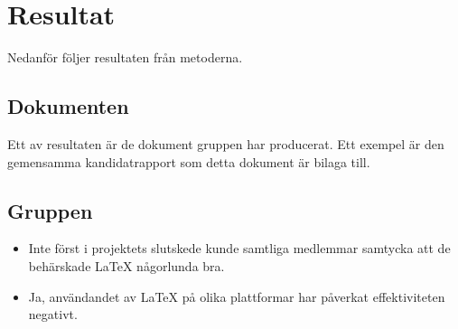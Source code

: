 \section{Resultat}
Nedanför följer resultaten från metoderna. 
\subsection{Dokumenten}
Ett av resultaten är de dokument gruppen har producerat. Ett exempel är den gemensamma kandidatrapport som detta dokument är bilaga till. 

\subsection{Gruppen}
\begin{itemize}
	\item Inte först i projektets slutskede kunde samtliga medlemmar samtycka att de behärskade {\LaTeX} någorlunda bra.
	\item Ja, användandet av {\LaTeX} på olika plattformar har påverkat effektiviteten negativt. 
\end{itemize}